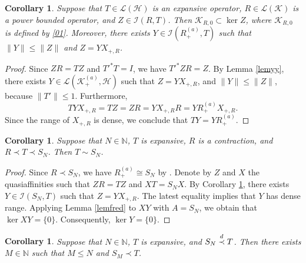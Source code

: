\documentclass[a4paper,oneside,11pt]{amsart}
\numberwithin{equation}{section}
\theoremstyle{plain}
\newtheorem{corollary}[theorem]{Corollary}
\theoremstyle{definition}
\begin{document}
\begin{corollary}\label{lemasymp11} Suppose that $T\in\mathcal  L(\mathcal H)$ is an expansive operator,  
$R\mathcal\in \mathcal L(\mathcal K)$ is a power bounded operator, and $Z\in\mathcal I(R,T)$. Then 
  $\mathcal K_{R,0}\subset\ker Z$, where  $\mathcal K_{R,0}$ is defined by \eqref{01}. Moreover, 
there exists $Y\in\mathcal I(R_+^{(a)},T)$  such that $\|Y\|\leq\|Z\|$  and $Z=YX_{+,R}$.
\end{corollary}
\begin{proof} Since $ZR=TZ$ and $T'^*T=I$, we have $T'^*ZR=Z$. By Lemma \ref{lemyy}, there exists 
$Y\in\mathcal L(\mathcal K_+^{(a)},\mathcal H)$  such that $Z=YX_{+,R}$, and  $\|Y\|\leq\|Z\|$, 
because $\|T'\|\leq 1$. Furthermore, 
 \begin{equation*}  TYX_{+,R} = TZ = ZR = YX_{+,R} R = YR_+^{(a)} X_{+,R}. 
\end{equation*}
Since the range of $X_{+,R}$ is dense, we conclude that $TY=YR_+^{(a)}$. 
\end{proof}

\begin{corollary}\label{colssquasi}  Suppose that $N\in\mathbb N$, $T$ is expansive, $R$ is a contraction, and 
$R\prec T\prec S_N$. Then $T\sim S_N$.
\end{corollary}
\begin{proof} Since $R\prec S_N$, we have $R_+^{(a)}\cong S_N$  by {\cite[Lemma 2.1]{gamalshiftindex}}.
 Denote by $Z$ and $X$ the quasiaffinities such that $ZR=TZ$ and $XT=S_NX$.  By Corollary \ref{lemasymp11}, there exists $Y\in\mathcal I(S_N,T)$  such that 
$Z=YX_{+,R}$. The latest equality implies that $Y$ has dense range. 
 Applying  Lemma \ref{lemfred}  to $XY$ with $A=S_N$, we obtain that $\ker XY=\{0\}$. Consequently, 
$\ker Y=\{0\}$.
\end{proof}


\begin{corollary} Suppose that $N\in\mathbb N$, $T$ is expansive, and $S_N\buildrel d\over\prec T$. 
Then there exists $M\in\mathbb N$ such that $M\leq N$ and $S_M\prec T$.
\end{corollary}
\end{document}
